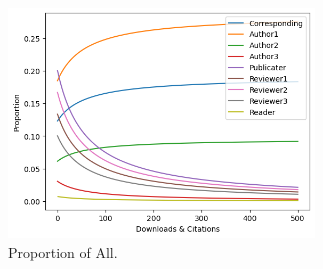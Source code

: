\documentclass[lettersize,journal]{IEEEtran}
\begin{document}
\begin{figure}[h]
  \centering
  \includegraphics[width=3.2in]{assets/proportion-all.png}
  \caption{Proportion of All.}
  \label{fig:proportion-all}
\end{figure}
\end{document}
